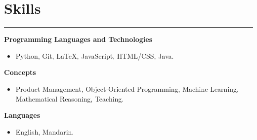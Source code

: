 \documentclass[10pt]{article}
\newcommand{\resumesection}[1]{\vspace{-0.2cm}\section*{#1}\vspace{-0.2cm}\hrule\vspace{0.2cm}}
\begin{document}
\resumesection{Skills}

\textbf{Programming Languages and Technologies}
\begin{itemize}
	\item Python, Git, \LaTeX, JavaScript, HTML/CSS, Java.
\end{itemize}

\textbf{Concepts}
\begin{itemize}
	\item Product Management, Object-Oriented Programming, Machine Learning, Mathematical Reasoning, Teaching.
\end{itemize}

\textbf{Languages}
\begin{itemize}
	\item English, Mandarin.
\end{itemize}
\end{document}
